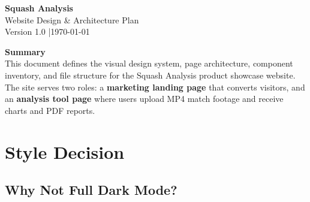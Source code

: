 \documentclass[12pt,a4paper]{article}
\begin{document}
\begin{titlepage}
  \centering
  \vspace*{2cm}


  \vspace{1.2cm}
  {\fontsize{28}{34}\selectfont\bfseries\color{textdark} Squash Analysis}\\[0.4cm]
  {\fontsize{16}{20}\selectfont\color{primary} Website Design \& Architecture Plan}\\[0.3cm]
  {\color{textmuted}\small Version 1.0 \quad|\quad \today}

  \vspace{1.5cm}

  \begin{tcolorbox}[darkbox, width=0.88\textwidth]
    \centering
    \textbf{Summary}\\[4pt]
    \small
    This document defines the visual design system, page architecture, component
    inventory, and file structure for the Squash Analysis product showcase website.
    The site serves two roles: a \textbf{marketing landing page} that converts
    visitors, and an \textbf{analysis tool page} where users upload MP4 match
    footage and receive charts and PDF reports.
  \end{tcolorbox}

  \vspace{1.5cm}
\end{titlepage}

\tableofcontents
\newpage

\section{Style Decision}

\subsection{Why Not Full Dark Mode?}
\end{document}
